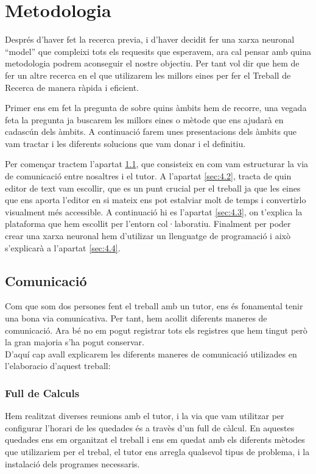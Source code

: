 \chapter{Metodologia}
Després d'haver fet la recerca previa, i d'haver decidit fer una xarxa neuronal ``model'' que compleixi tots els requesits que esperavem, ara cal pensar amb quina metodologia podrem aconseguir el nostre objectiu. Per tant vol dir que hem de fer un altre recerca en el que utilizarem les millors eines per fer el Treball de Recerca de manera ràpida i eficient.


Primer ens em fet la pregunta de  sobre quins àmbits hem de recorre, una vegada feta la pregunta ja buscarem les millors eines o mètode que ens ajudarà en cadascún dels àmbits. A continuació farem unes presentacions dels àmbits que vam tractar i les diferents solucions que vam donar i el definitiu.

Per començar tractem  l'apartat \ref{sec:4.1}, que consisteix en com vam estructurar la via de comunicació entre nosaltres i el tutor. A l'apartat \ref{sec:4.2}, tracta de quin editor de text vam escollir, que es un punt crucial per el treball ja que les eines que ens aporta l'editor en si mateix ens pot estalviar molt de temps i convertirlo visualment més accessible. A continuació hi es l'apartat \ref{sec:4.3}, on t'explica la plataforma que hem escollit per l'entorn col·laboratiu. Finalment per poder crear una xarxa neuronal hem d'utilizar un llenguatge de programació i això s'explicarà a l'apartat \ref{sec:4.4}.



\section{Comunicació}\label{sec:4.1}
Com que som dos persones fent el treball amb un tutor, ens és fonamental tenir una bona via comunicativa. Per tant, hem acollit diferents maneres de comunicació. Ara bé no em pogut registrar tots els registres que hem tingut però la gran majoria s'ha pogut conservar.\\
D'aquí cap avall explicarem les diferents maneres de comunicació utilizades en l'elaboracio d'aquest treball:\\
\subsection{Full de Calculs}
Hem realitzat diverses reunions amb el tutor, i la via que vam utilitzar per configurar l'horari de les quedades és a travès d'un full de càlcul. En aquestes quedades ens em organitzat el treball i ens em quedat amb els diferents mètodes que utilizariem per el trebal, el tutor ens arregla qualsevol tipus de problema, i la instalació dels programes necessaris.
